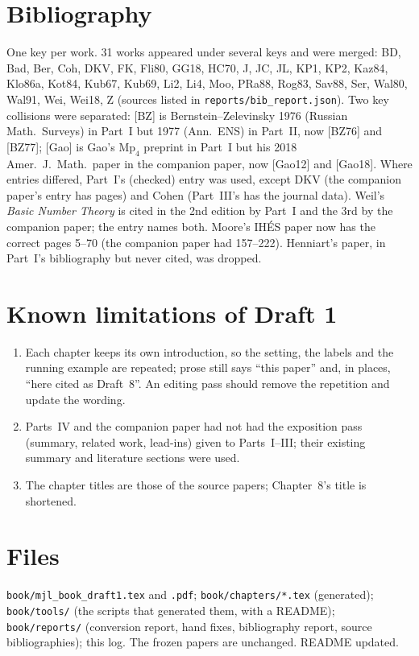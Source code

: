 \documentclass[11pt]{article}
\begin{document}
\section*{Bibliography}
One key per work.  31 works appeared under several keys and were merged:
BD, Bad, Ber, Coh, DKV, FK, Fli80, GG18, HC70, J, JC, JL, KP1, KP2, Kaz84,
Klo86a, Kot84, Kub67, Kub69, Li2, Li4, Moo, PRa88, Rog83, Sav88, Ser,
Wal80, Wal91, Wei, Wei18, Z (sources listed in
\texttt{reports/bib\_report.json}).  Two key collisions were separated:
[BZ] is Bernstein--Zelevinsky 1976 (Russian Math.\ Surveys) in Part~I but
1977 (Ann.\ ENS) in Part~II, now [BZ76] and [BZ77]; [Gao] is Gao's
$\mathrm{Mp}_4$ preprint in Part~I but his 2018 Amer.\ J.\ Math.\ paper in
the companion paper, now [Gao12] and [Gao18].  Where entries differed,
Part~I's (checked) entry was used, except DKV (the companion paper's
entry has pages) and Cohen (Part~III's has the journal data).  Weil's
\emph{Basic Number Theory} is cited in the 2nd edition by Part~I and the
3rd by the companion paper; the entry names both.  Moore's IH\'ES paper
now has the correct pages 5--70 (the companion paper had 157--222).
Henniart's paper, in Part~I's bibliography but never cited, was dropped.

\section*{Known limitations of Draft 1}
\begin{enumerate}[leftmargin=*]
\item Each chapter keeps its own introduction, so the setting, the
labels and the running example are repeated; prose still says ``this
paper'' and, in places, ``here cited as Draft~8''.  An editing pass
should remove the repetition and update the wording.
\item Parts~IV and the companion paper had not had the exposition pass
(summary, related work, lead-ins) given to Parts~I--III; their
existing summary and literature sections were used.
\item The chapter titles are those of the source papers; Chapter~8's
title is shortened.
\end{enumerate}

\section*{Files}
\texttt{book/mjl\_book\_draft1.tex} and \texttt{.pdf};
\texttt{book/chapters/*.tex} (generated);
\texttt{book/tools/} (the scripts that generated them, with a README);
\texttt{book/reports/} (conversion report, hand fixes, bibliography
report, source bibliographies); this log.  The frozen papers are
unchanged.  README updated.
\end{document}
